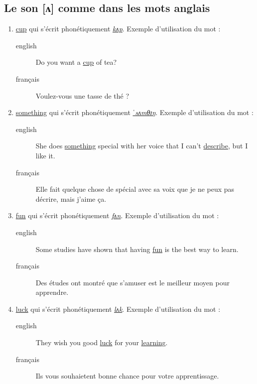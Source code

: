 \subsection{Le son [ʌ] comme dans les mots anglais}
\label{sec:org2b5aca8}
\begin{enumerate}
\item \href{http://www.wordreference.com/enfr/cup}{cup} qui s'écrit phonétiquement \href{https://en.oxforddictionaries.com/definition/cup}{\emph{kʌp}}. Exemple d'utilisation du mot :
\begin{description}
\item[{english}] \textenglish{Do you want a \href{https://youtu.be/pjcOzqxu4JQ}{cup} of tea?}
\item[{français}] Voulez-vous une tasse de thé ?
\end{description}
\item \href{http://www.wordreference.com/enfr/something}{something} qui s'écrit phonétiquement \href{https://en.oxforddictionaries.com/definition/something}{\emph{ˈsʌmθɪŋ}}. Exemple d'utilisation du mot : 
\begin{description}
\item[{english}] \textenglish{She does \href{https://youtu.be/UelDrZ1aFeY}{something} special with her voice that I can't
\href{https://genius.com/The-beatles-something-lyrics}{describe}, but I like it.}
\item[{français}] Elle fait quelque chose de spécial avec sa voix que
je ne peux pas décrire, mais j'aime ça.
\end{description}
\item \href{http://www.wordreference.com/enfr/fun}{fun} qui s'écrit phonétiquement \href{https://en.oxforddictionaries.com/definition/fun}{\emph{fʌn}}. Exemple d'utilisation du mot : 
\begin{description}
\item[{english}] \textenglish{Some studies have shown that having \href{https://youtu.be/KXJNoC6CuYE}{fun} is the best
way to learn.}
\item[{français}] Des études ont montré que s'amuser est le meilleur
moyen pour apprendre.
\end{description}
\item \href{http://www.wordreference.com/enfr/luck}{luck} qui s'écrit phonétiquement \href{https://en.oxforddictionaries.com/definition/luck}{\emph{lʌk}}. Exemple d'utilisation du mot :
\begin{description}
\item[{english}] \textenglish{They wish you good \href{https://youtu.be/LQCY2zL0Jr8}{luck} for your \href{https://youtu.be/o61dD6hwrdM}{learning}.}
\item[{français}] Ils vous souhaietent bonne chance pour votre
apprentissage.
\end{description}
\end{enumerate}
